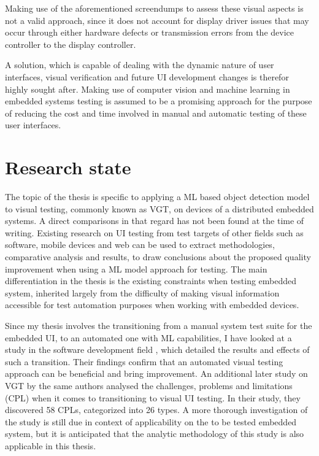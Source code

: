 \documentclass[Proposal,BIC,english,fhCitStyle,IEEE]{BASE/twbook} %
\begin{document}
Making use of the aforementioned screendumps to assess these visual aspects is not a valid approach, since it does not account for display driver issues that may occur through either hardware defects or transmission errors from the device controller to the display controller.

A solution, which is capable of dealing with the dynamic nature of user interfaces, visual verification and future UI development changes is therefor highly sought after. Making use of computer vision and machine learning in embedded systems testing is assumed to be a promising approach for the purpose of reducing the cost and time involved in manual and automatic testing of these user interfaces.
\chapter{Research state}
The topic of the thesis is specific to applying a ML based object detection model to visual testing, commonly known as VGT, on devices of a distributed embedded systems. A direct comparisons in that regard has not been found at the time of writing. Existing research on UI testing from test targets of other fields such as software, mobile devices and web can be used to extract methodologies, comparative analysis and results, to draw conclusions about the proposed quality improvement when using a ML model approach for testing. The main differentiation in the thesis is the existing constraints when testing embedded system, inherited largely from the difficulty of making visual information accessible for test automation purposes when working with embedded devices.

Since my thesis involves the transitioning from a manual system test suite for the embedded UI, to an automated one with ML capabilities, I have looked at a study in the software development field \autocite{alegrothTransitioningManualSystem2013}, which detailed the results and effects of such a transition. Their findings confirm that an automated visual testing approach can be beneficial and bring improvement.
An additional later study on VGT by the same authors \autocite{alegrothVisualGUITesting2015} analysed the challenges, problems and limitations (CPL) when it comes to transitioning to visual UI testing. In their study, they discovered 58 CPLs, categorized into 26 types. A more thorough investigation of the study is still due in context of applicability on the to be tested embedded system, but it is anticipated that the analytic methodology of this study is also applicable in this thesis.

\end{document}
